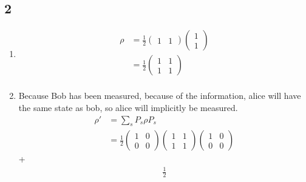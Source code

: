 \documentclass{article}%
\begin{document}
\subsection{2}

\begin{enumerate}
    \item \begin{align*}
              \rho & = \frac{1}{2} \begin{pmatrix}
                                       1 & 1
                                   \end{pmatrix}\begin{pmatrix}
                                                    1 \\
                                                    1
                                                \end{pmatrix} \\
                   & = \frac{1}{2} \begin{pmatrix}
                                       1 & 1 \\
                                       1 & 1
                                   \end{pmatrix}              \\
          \end{align*}
    \item Because Bob has been measured, because of the information, alice will have the same state as bob, so alice will implicitly be measured.
          \begin{align*}
              \rho' & = \sum_{s}^{} P_s \rho P_s \\
                    & = \frac{1}{2}
              \begin{pmatrix}
                  1 & 0 \\
                  0 & 0
              \end{pmatrix}
              \begin{pmatrix}
                  1 & 1 \\
                  1 & 1
              \end{pmatrix}
              \begin{pmatrix}
                  1 & 0 \\
                  0 & 0
              \end{pmatrix}
          \end{align*} +
          \begin{align*}
              \frac{1}{2}

\end{align*}
\end{enumerate}
\end{document}
